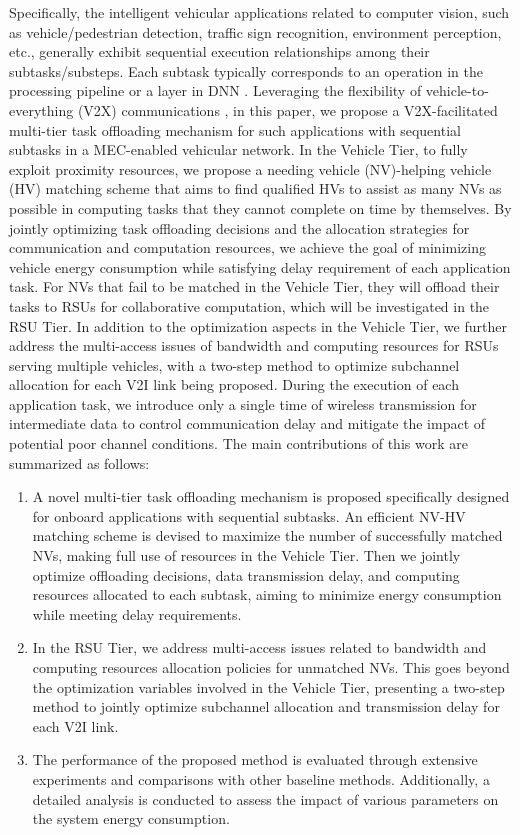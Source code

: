 \documentclass[lettersize,journal]{IEEEtran}
\begin{document}
Specifically, the intelligent vehicular applications related to computer vision, such as vehicle/pedestrian detection, traffic sign recognition, environment perception, etc., generally exhibit sequential execution relationships among their subtasks/substeps. Each subtask typically corresponds to an operation in the processing pipeline or a layer in DNN \cite{ref8}. Leveraging the flexibility of vehicle-to-everything (V2X) communications \cite{ref27}, in this paper, we propose a V2X-facilitated multi-tier task offloading mechanism for such applications with sequential subtasks in a MEC-enabled vehicular network. In the Vehicle Tier, to fully exploit proximity resources, we propose a needing vehicle (NV)-helping vehicle (HV) matching scheme that aims to find qualified HVs to assist as many NVs as possible in computing tasks that they cannot complete on time by themselves. By jointly optimizing task offloading decisions and the allocation strategies for communication and computation resources, we achieve the goal of minimizing vehicle energy consumption while satisfying delay requirement of each application task. For NVs that fail to be matched in the Vehicle Tier, they will offload their tasks to RSUs for collaborative computation, which will be investigated in the RSU Tier. In addition to the optimization aspects in the Vehicle Tier, we further address the multi-access issues of bandwidth and computing resources for RSUs serving multiple vehicles, with a two-step method to optimize subchannel allocation for each V2I link being proposed. During the execution of each application task, we introduce only a single time of wireless transmission for intermediate data to control communication delay and mitigate the impact of potential poor channel conditions. The main contributions of this work are summarized as follows:

\begin{enumerate}
    \item A novel multi-tier task offloading mechanism is proposed specifically designed for onboard applications with sequential subtasks. An efficient NV-HV matching scheme is devised to maximize the number of successfully matched NVs, making full use of resources in the Vehicle Tier. Then we jointly optimize offloading decisions, data transmission delay, and computing resources allocated to each subtask, aiming to minimize energy consumption while meeting delay requirements.
    \item In the RSU Tier, we address multi-access issues related to bandwidth and computing resources allocation policies for unmatched NVs. This goes beyond the optimization variables involved in the Vehicle Tier, presenting a two-step method to jointly optimize subchannel allocation and transmission delay for each V2I link. 
    \item The performance of the proposed method is  evaluated through extensive experiments and comparisons with other baseline methods. Additionally, a detailed analysis is conducted to assess the impact of various parameters on the system energy consumption.
\end{enumerate}
\end{document}
